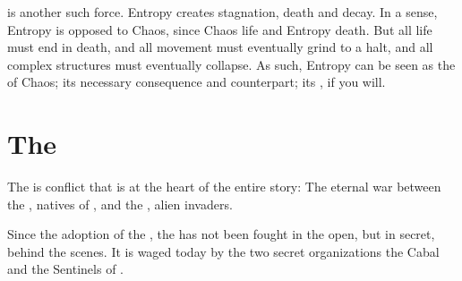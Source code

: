 
 is another such force. 
Entropy creates stagnation, death and decay. 
In a sense, Entropy is opposed to Chaos, since Chaos  life and Entropy  death. 
But all life must end in death, and all movement must eventually grind to a halt, and all complex structures must eventually collapse. 
As such, Entropy can be seen as the  of Chaos; its necessary consequence and counterpart; its , if you will. 















\section{The \Feud}
The \feud{} is conflict that is at the heart of the entire story: 
The eternal war between the \dragons, natives of \Miith{}, and the \banes, alien invaders. 

Since the adoption of the , the \feud{} has not been fought in the open, but in secret, behind the scenes. It is waged today by the two secret organizations the Cabal and the Sentinels of \Miith{}. 






